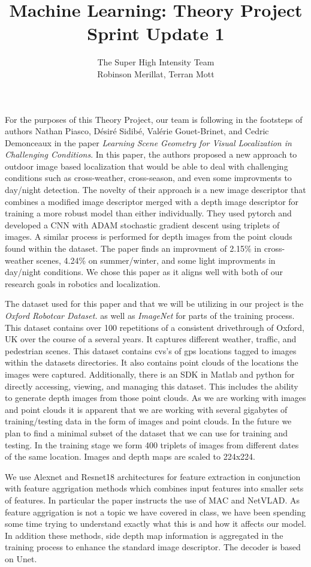 \documentclass[11pt]{article}
\title{Machine Learning: Theory Project Sprint Update 1}
\author{The Super High Intensity Team\\Robinson Merillat, Terran Mott}
\begin{document}
\maketitle

For the purposes of this Theory Project, our team is following in the footsteps of authors Nathan Piasco, D\'{e}sir\'{e} Sidib\'{e}, Val\'{e}rie Gouet-Brinet, and Cedric Demonceaux in the paper \textit{Learning Scene Geometry for Visual Localization in Challenging Conditions}. In this paper, the authors proposed a new approach to outdoor image based localization that would be able to deal with challenging conditions such as cross-weather, cross-season, and even some improvments to day/night detection. The novelty of their approach is a new image descriptor that combines a modified image descriptor merged with a depth image descriptor for training a more robust model than either individually. They used pytorch and developed a CNN with ADAM stochastic gradient descent using triplets of images. A similar process is performed for depth images from the point clouds found within the dataset. The paper finds an improvment of 2.15\% in cross-weather scenes, 4.24\% on summer/winter, and some light improvments in day/night conditions. We chose this paper as it aligns well with both of our research goals in robotics and localization.

The dataset used for this paper and that we will be utilizing in our project is the \textit{Oxford Robotcar Dataset.} as well as \textit{ImageNet} for parts of the training process. This dataset contains over 100 repetitions of a consistent drivethrough of Oxford, UK over the course of a several years. It captures different weather, traffic, and pedestrian scenes. This dataset contains cvs's of gps locations tagged to images within the datasets directories. It also contains point clouds of the locations the images were captured. Additionally, there is an SDK in Matlab and python for directly accessing, viewing, and managing this dataset. This includes the ability to generate depth images from those point clouds. As we are working with images and point clouds it is apparent that we are working with several gigabytes of training/testing data in the form of images and point clouds. In the future we plan to find a minimal subset of the dataset that we can use for training and testing. In the training stage we form 400 triplets of images from different dates of the same location. Images and depth maps are scaled to 224x224.

We use Alexnet and Resnet18 architectures for feature extraction in conjunction with feature aggrigation methods which combines input features into smaller sets of features. In particular the paper instructs the use of MAC and NetVLAD. As feature aggrigation is not a topic we have covered in class, we have been spending some time trying to understand exactly what this is and how it affects our model. In addition these methods, side depth map information is aggregated in the training process to enhance the standard image descriptor. The decoder is based on Unet.
\end{document}
